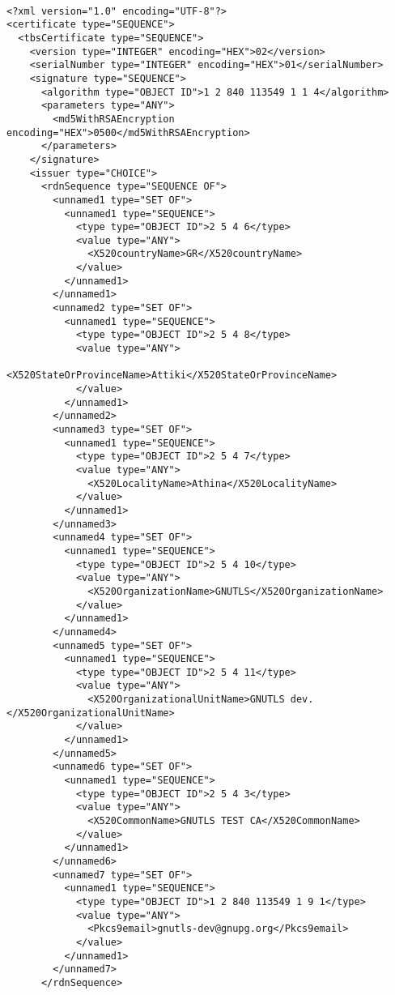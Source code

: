 \begin{verbatim}

<?xml version="1.0" encoding="UTF-8"?>
<certificate type="SEQUENCE">
  <tbsCertificate type="SEQUENCE">
    <version type="INTEGER" encoding="HEX">02</version>
    <serialNumber type="INTEGER" encoding="HEX">01</serialNumber>
    <signature type="SEQUENCE">
      <algorithm type="OBJECT ID">1 2 840 113549 1 1 4</algorithm>
      <parameters type="ANY">
        <md5WithRSAEncryption encoding="HEX">0500</md5WithRSAEncryption>
      </parameters>
    </signature>
    <issuer type="CHOICE">
      <rdnSequence type="SEQUENCE OF">
        <unnamed1 type="SET OF">
          <unnamed1 type="SEQUENCE">
            <type type="OBJECT ID">2 5 4 6</type>
            <value type="ANY">
              <X520countryName>GR</X520countryName>
            </value>
          </unnamed1>
        </unnamed1>
        <unnamed2 type="SET OF">
          <unnamed1 type="SEQUENCE">
            <type type="OBJECT ID">2 5 4 8</type>
            <value type="ANY">
              <X520StateOrProvinceName>Attiki</X520StateOrProvinceName>
            </value>
          </unnamed1>
        </unnamed2>
        <unnamed3 type="SET OF">
          <unnamed1 type="SEQUENCE">
            <type type="OBJECT ID">2 5 4 7</type>
            <value type="ANY">
              <X520LocalityName>Athina</X520LocalityName>
            </value>
          </unnamed1>
        </unnamed3>
        <unnamed4 type="SET OF">
          <unnamed1 type="SEQUENCE">
            <type type="OBJECT ID">2 5 4 10</type>
            <value type="ANY">
              <X520OrganizationName>GNUTLS</X520OrganizationName>
            </value>
          </unnamed1>
        </unnamed4>
        <unnamed5 type="SET OF">
          <unnamed1 type="SEQUENCE">
            <type type="OBJECT ID">2 5 4 11</type>
            <value type="ANY">
              <X520OrganizationalUnitName>GNUTLS dev.</X520OrganizationalUnitName>
            </value>
          </unnamed1>
        </unnamed5>
        <unnamed6 type="SET OF">
          <unnamed1 type="SEQUENCE">
            <type type="OBJECT ID">2 5 4 3</type>
            <value type="ANY">
              <X520CommonName>GNUTLS TEST CA</X520CommonName>
            </value>
          </unnamed1>
        </unnamed6>
        <unnamed7 type="SET OF">
          <unnamed1 type="SEQUENCE">
            <type type="OBJECT ID">1 2 840 113549 1 9 1</type>
            <value type="ANY">
              <Pkcs9email>gnutls-dev@gnupg.org</Pkcs9email>
            </value>
          </unnamed1>
        </unnamed7>
      </rdnSequence>

\end{verbatim}
